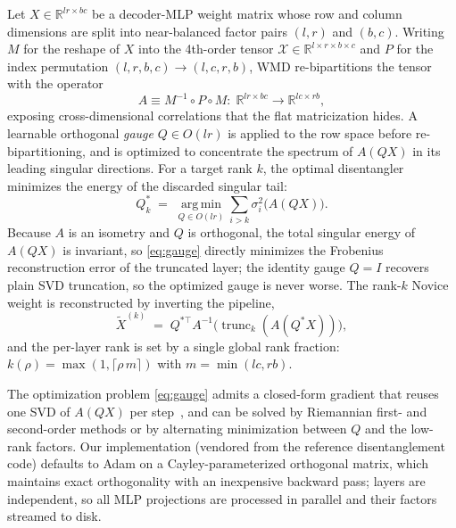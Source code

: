 \documentclass[times, 10pt,twocolumn]{article}
\begin{document}
Let $X \in \mathbb{R}^{lr \times bc}$ be a decoder-MLP weight matrix whose row
and column dimensions are split into near-balanced factor pairs $(l, r)$ and
$(b, c)$. Writing $M$ for the reshape of $X$ into the 4th-order tensor
$\mathcal{X} \in \mathbb{R}^{l \times r \times b \times c}$ and $P$ for the
index permutation $(l,r,b,c) \to (l,c,r,b)$, WMD re-bipartitions the tensor
with the operator
\begin{equation}
A \equiv M^{-1} \circ P \circ M \colon\;
\mathbb{R}^{lr \times bc} \to \mathbb{R}^{lc \times rb},
\end{equation}
exposing cross-dimensional correlations that the flat matricization hides. A
learnable orthogonal \emph{gauge} $Q \in O(lr)$ is applied to the row space
before re-bipartitioning, and is optimized to concentrate the spectrum of
$A(QX)$ in its leading singular directions. For a target rank $k$, the
optimal disentangler minimizes the energy of the discarded singular tail:
\begin{equation}
Q^{*}_{k} \;=\; \operatorname*{arg\,min}_{Q \in O(lr)}
\sum_{i > k} \sigma_i^2\bigl(A(QX)\bigr).
\label{eq:gauge}
\end{equation}
Because $A$ is an isometry and $Q$ is orthogonal, the total singular energy of
$A(QX)$ is invariant, so \eqref{eq:gauge} directly minimizes the Frobenius
reconstruction error of the truncated layer; the identity gauge $Q{=}I$
recovers plain SVD truncation, so the optimized gauge is never worse. The
rank-$k$ Novice weight is reconstructed by inverting the pipeline,
\begin{equation}
\widetilde{X}^{(k)} \;=\; Q^{*\top}
A^{-1}\bigl(\operatorname{trunc}_k(A(Q^{*}X))\bigr),
\label{eq:bake}
\end{equation}
and the per-layer rank is set by a single global rank fraction:
$k(\rho) = \max(1, \lceil \rho\, m \rceil)$ with $m = \min(lc, rb)$.

The optimization problem \eqref{eq:gauge} admits a closed-form gradient that
reuses one SVD of $A(QX)$ per step~\cite{wei2025tensor}, and can be solved by
Riemannian first- and second-order methods or by alternating minimization
between $Q$ and the low-rank factors. Our implementation (vendored from the
reference disentanglement code) defaults to Adam on a Cayley-parameterized
orthogonal matrix, which maintains exact orthogonality with an inexpensive
backward pass; layers are independent, so all MLP projections are processed in
parallel and their factors streamed to disk.
\end{document}
